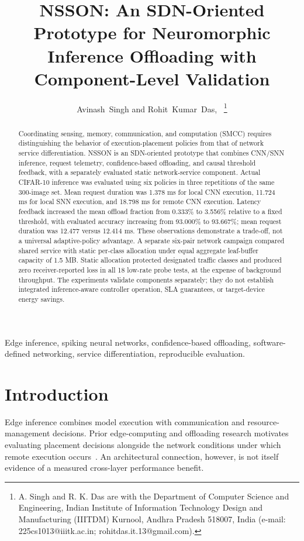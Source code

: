 \documentclass[journal]{IEEEtran}
\title{NSSON: An SDN-Oriented Prototype for Neuromorphic Inference Offloading with Component-Level Validation}
\author{Avinash~Singh and Rohit~Kumar~Das,~\IEEEmembership{Senior Member,~IEEE}%
\thanks{A. Singh and R. K. Das are with the Department of Computer Science and Engineering, Indian Institute of Information Technology Design and Manufacturing (IIITDM) Kurnool, Andhra Pradesh 518007, India (e-mail: 225cs1013@iiitk.ac.in; rohitdas.it.13@gmail.com).}}
\begin{document}
\maketitle

\begin{abstract}
Coordinating sensing, memory, communication, and computation (SMCC) requires distinguishing the behavior of execution-placement policies from that of network service differentiation. NSSON is an SDN-oriented prototype that combines CNN/SNN inference, request telemetry, confidence-based offloading, and causal threshold feedback, with a separately evaluated static network-service component. Actual CIFAR-10 inference was evaluated using six policies in three repetitions of the same 300-image set. Mean request duration was 1.378 ms for local CNN execution, 11.724 ms for local SNN execution, and 18.798 ms for remote CNN execution. Latency feedback increased the mean offload fraction from 0.333\% to 3.556\% relative to a fixed threshold, with evaluated accuracy increasing from 93.000\% to 93.667\%; mean request duration was 12.477 versus 12.414 ms. These observations demonstrate a trade-off, not a universal adaptive-policy advantage. A separate six-pair network campaign compared shared service with static per-class allocation under equal aggregate leaf-buffer capacity of 1.5 MB. Static allocation protected designated traffic classes and produced zero receiver-reported loss in all 18 low-rate probe tests, at the expense of background throughput. The experiments validate components separately; they do not establish integrated inference-aware controller operation, SLA guarantees, or target-device energy savings.
\end{abstract}
\begin{IEEEkeywords}
Edge inference, spiking neural networks, confidence-based offloading, software-defined networking, service differentiation, reproducible evaluation.
\end{IEEEkeywords}

\section{Introduction}
\label{sec:intro}
Edge inference combines model execution with communication and resource-management decisions. Prior edge-computing and offloading research motivates evaluating placement decisions alongside the network conditions under which remote execution occurs~\cite{shi2016edge,satyanarayanan2017emergence,mach2017mobile,mao2017survey}. An architectural connection, however, is not itself evidence of a measured cross-layer performance benefit.
\end{document}

